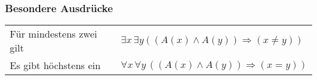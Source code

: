 \subsubsection{Besondere Ausdrücke}
\begin{tabular}{ll}
	Für mindestens zwei gilt~~ & $\exists x\, \exists y ((A(x) \wedge A(y)) \Rightarrow (x \neq y))$\\
	Es gibt höchstens ein & $\forall x\, \forall y\,((A(x) \wedge A(y)) \Rightarrow (x = y))$\\
\end{tabular}

